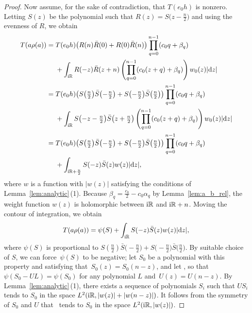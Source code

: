 \documentclass[pdftex]{sigma}
\newcommand\RR{\mathbb{R}}
\renewcommand\d{\mathrm{d}}
\newcommand\R{\bar{R}}
\renewcommand\S{\bar{S}}
\numberwithin{equation}{section}
\theoremstyle{definition}
\begin{document}
\begin{proof}
 Now assume, for the sake of contradiction,
 that $T(e_0 h)$ is nonzero.
 Letting $S(z)$ be the polynomial
 such that $R(z) = S\bigl(z - \frac{n}{2}\bigr)$
 and using the evenness of $R$,
 we obtain
 \begin{align*}
 T(a \rho(a)) ={}& T(e_0 h) \bigl(R(n) \R(0) + R(0) \R(n)\bigr)
 \prod\limits_{q = 0}^{n - 1} (c_0 q + \beta_q) \\
 & + \int_{{\rm i}\RR} R(-z) \R(z + n)
 \left( \prod\limits_{q = 0}^{n - 1}
 (c_0 (z + q) + \beta_q)\right) w_0 (z) |\d z| \\
 ={}& T(e_0 h) \bigl(S\bigl(\tfrac{n}{2}\bigr) \S\bigl(-\tfrac{n}{2}\bigr)
 + S\bigl(-\tfrac{n}{2}\bigr) \S\bigl(\tfrac{n}{2}\bigr)\bigr)
 \prod\limits_{q = 0}^{n - 1} (c_0 q + \beta_q) \\
 & + \int_{{\rm i}\RR}
 S\bigl(-z - \tfrac{n}{2}\bigr) \S\bigl(z + \tfrac{n}{2}\bigr)
 \left( \prod\limits_{q = 0}^{n - 1}
 (c_0 (z + q) + \beta_q)\right) w_0 (z) |\d z| \\
 ={}& T(e_0 h) \bigl(S\bigl(\tfrac{n}{2}\bigr) \S\bigl(-\tfrac{n}{2}\bigr)
 + S\bigl(-\tfrac{n}{2}\bigr) \S\bigl(\tfrac{n}{2}\bigr)\bigr)
 \prod\limits_{q = 0}^{n - 1} (c_0 q + \beta_q) \\
 & + \int_{{\rm i}\RR + \frac{n}{2}} S(-z) \S(z) w(z) |\d z|,
 \end{align*}
 where $w$ is a function with
 $|w(z)|$ satisfying the conditions of Lemma~\ref{lem:analytic}\,(1).
 Because $\beta_q = \frac{c_0}{2} - c_0 \alpha_q$
 by Lemma~\ref{lem:a_b_rel},
 the weight function $w(z)$ is holomorphic
 between ${\rm i}\RR$ and ${\rm i}\RR + n$.
 Moving the contour of integration, we obtain
 \begin{equation*}
 T(a \rho(a)) = \psi(S)
 + \int_{{\rm i}\RR} S(-z) \S(z) w(z) |\d z|,
 \end{equation*}
 where $\psi(S)$ is proportional to
 $S(\frac{n}{2})\S\bigl(-\frac{n}{2}\bigr) + S\bigl(-\frac{n}{2}\bigr)\S\bigl(\frac{n}{2}\bigr)$.
 By suitable choice of $S$,
 we can force~$\psi(S)$ to be negative;
 let $S_0$ be a polynomial with this property
 and satisfying that~$S_0(z) = S_0(n - z)$,
 and let ,
 so that $\psi(S_0 - UL) = \psi(S_0)$ for any polynomial $L$
 and~$U(z) = U(n - z)$.
 By Lemma~\ref{lem:analytic}\,(1), there exists a sequence of polynomials
 $S_i$ such that $U S_i$ tends to $S_0$
 in the space $L^2 ({\rm i}\RR, |w(z)| + |w(n - z)|)$.
 It follows from the symmetry of $S_0$ and $U$ that~
 tends to $S_0$
 in the space $L^2({\rm i}\RR, |w(z)|)$.

\end{proof}
\end{document}

